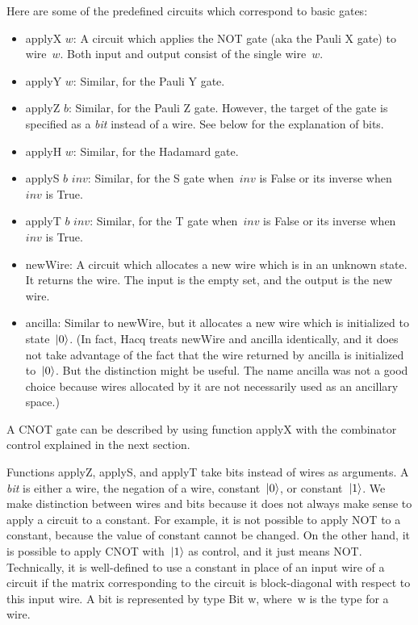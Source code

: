 \documentclass[11pt]{article}
\DeclarePairedDelimiter{\ket}{\lvert}{\rangle}
\newcommand{\var}[1]{\mathit{#1}}
\begin{document}
Here are some of the predefined circuits which correspond to basic gates:
\begin{itemize}
\item
  \textsf{applyX $\var{w}$}:
  A circuit which applies the NOT gate (aka the Pauli X gate) to wire~$\var{w}$.
  Both input and output consist of the single wire~$\var{w}$.
\item
  \textsf{applyY $\var{w}$}:
  Similar, for the Pauli Y gate.
\item
  \textsf{applyZ $\var{b}$}:
  Similar, for the Pauli Z gate.
  However, the target of the gate is specified as a \emph{bit} instead of a wire.
  See below for the explanation of bits.
\item
  \textsf{applyH $\var{w}$}:
  Similar, for the Hadamard gate.
\item
  \textsf{applyS $\var{b}$ $\var{inv}$}:
  Similar, for the S gate when~$\var{inv}$ is False or its inverse when~$\var{inv}$ is True.
\item
  \textsf{applyT $\var{b}$ $\var{inv}$}:
  Similar, for the T gate when~$\var{inv}$ is False or its inverse when~$\var{inv}$ is True.
\item
  \textsf{newWire}:
  A circuit which allocates a new wire which is in an unknown state.
  It returns the wire.
  The input is the empty set, and the output is the new wire.
\item
  \textsf{ancilla}:
  Similar to \textsf{newWire}, but it allocates a new wire which is initialized to state~$\ket0$.
  (In fact, Hacq treats \textsf{newWire} and \textsf{ancilla} identically,
  and it does not take advantage of the fact
  that the wire returned by \textsf{ancilla} is initialized to~$\ket0$.
  But the distinction might be useful.
  The name \textsf{ancilla} was not a good choice
  because wires allocated by it are not necessarily used as an ancillary space.)
\end{itemize}

A CNOT gate can be described by using function \textsf{applyX}
with the combinator \textsf{control} explained in the next section.

Functions \textsf{applyZ}, \textsf{applyS}, and \textsf{applyT}
take bits instead of wires as arguments.
A \emph{bit} is either a wire, the negation of a wire, constant~$\ket0$, or constant~$\ket1$.
We make distinction between wires and bits
because it does not always make sense to apply a circuit to a constant.
For example, it is not possible to apply NOT to a constant,
because the value of constant cannot be changed.
On the other hand, it is possible to apply CNOT with~$\ket1$ as control,
and it just means NOT.
Technically, it is well-defined to use a constant in place of an input wire of a circuit
if the matrix corresponding to the circuit is block-diagonal with respect to this input wire.
A bit is represented by type \textsf{Bit w}, where~\textsf{w} is the type for a wire.
\end{document}

